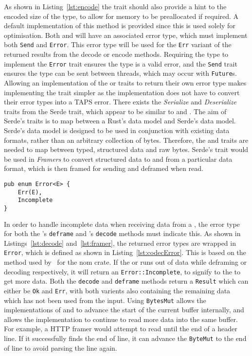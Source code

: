 As shown in Listing~\ref{lst:encode} the \encode{} trait should also provide a hint to the encoded size of the type,
to allow for memory to be preallocated if required.
A default implementation of this method is provided since this is used solely for optimisation.
Both \encode{} and \decode{} will have an associated error type, which must implement both \texttt{Send} and
\texttt{Error}.
This error type will be used for the \texttt{Err} variant of the returned results from the decode or encode methods.
Requiring the type to implement the \texttt{Error} trait ensures the type is a valid error, and the \texttt{Send} trait
ensures the type can be sent between threads, which may occur with \texttt{Future}s.
Allowing an implementation of the \encode{} or \decode{} traits to return their own error type makes
implementing the trait simpler as the implementation does not have to convert their error types into a TAPS error.
There exists the \emph{Serialize} and \emph{Deserialize} traits from the Serde trait, which appear to be similar to
\encode{} and \decode{}.
The aim of Serde's traits is to map between a Rust's data model and Serde's data model.
Serde's data model is designed to be used in conjunction with existing data formats, rather than an arbitrary collection
of bytes.
Therefore, the \encode{} and \decode{} traits are needed to map between typed, structured data and raw bytes.
Serde's trait would be used in \emph{Framers} to convert structured data to and from a particular data format, which is
then framed for sending and deframed when read.

\begin{lstlisting}[float=h, label=lst:codecError, caption={The Error type for deframe and decode methods,
showing the Incomplete varient.
It is often aliased to DecodeError.}]
pub enum Error<E> {
    Err(E),
    Incomplete
}
\end{lstlisting}

In order to handle incomplete data when receiving data from a \connection{}, the error type for both the
\framer{}'s \texttt{deframe} and \decode{}'s \texttt{decode} methods must indicate this.
As shown in Listings~\ref{lst:decode} and~\ref{lst:framer}, the returned error types are wrapped in \texttt{Error},
which is defined as shown in Listing~\ref{lst:codecError}.
This is based on the method used by~\cite{geal_nomerrrust_} for the nom crate.
If the \framer{} or \decode{} runs out of data while deframing or decoding respectively, it will return an
\texttt{Error::Incomplete}, to signify to the \connection{} to get more data.
Both the \texttt{decode} and \texttt{deframe} methods return a \texttt{Result} which can either be \texttt{Ok} and
\texttt{Err}, with both varients also containing the remaining data which has not been used from the input.
Using \texttt{BytesMut} allows the implementations of \decode{} and \framer{} to advance the start of the
current buffer internally, and allows the \connection{} implementation to continue to read more data into the same
buffer.
For example, a HTTP framer would attempt to read until the end of a header line.
If it successfully finds the end of line, it can advance the \texttt{ByteMut} to the end of line to avoid parsing the
line again.

